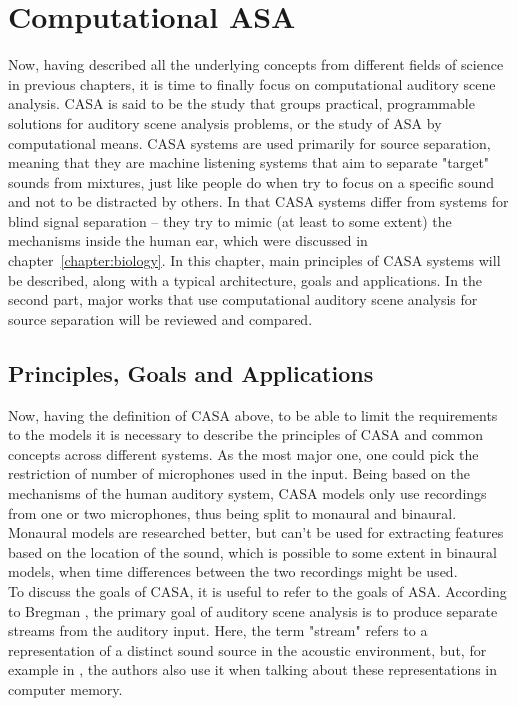 \chapter{Computational ASA}\label{chapter:casa}

Now, having described all the underlying concepts from different fields of science in previous chapters, it is time to finally focus on computational auditory scene analysis. CASA is said to be the study that groups practical, programmable solutions for auditory scene analysis problems, or the study of ASA by computational means. CASA systems are used primarily for source separation, meaning that they are machine listening systems that aim to separate "target" sounds from mixtures, just like people do when try to focus on a specific sound and not to be distracted by others. In that CASA systems differ from systems for blind signal separation – they try to mimic (at least to some extent) the mechanisms inside the human ear, which were discussed in chapter~\ref{chapter:biology}. In this chapter, main principles of CASA systems will be described, along with a typical architecture, goals and applications. In the second part, major works that use computational auditory scene analysis for source separation will be reviewed and compared.

\section{Principles, Goals and Applications}

Now, having the definition of CASA above, to be able to limit the requirements to the models it is necessary to describe the principles of CASA and common concepts across different systems. As the most major one, one could pick the restriction of number of microphones used in the input. Being based on the mechanisms of the human auditory system, CASA models only use recordings from one or two microphones, thus being split to monaural and binaural. Monaural models are researched better, but can't be used for extracting features based on the location of the sound, which is possible to some extent in binaural models, when time differences between the two recordings might be used.\\

To discuss the goals of CASA, it is useful to refer to the goals of ASA. According to Bregman \cite{Bregman1990}, the primary goal of auditory scene analysis is to produce separate streams from the auditory input. Here, the term "stream" refers to a representation of a distinct sound source in the acoustic environment, but, for example in \cite{Wang2006}, the authors also use it when talking about these representations in computer memory.\\

